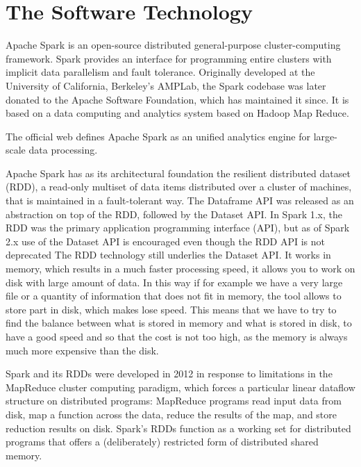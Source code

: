 \section{The Software Technology}
\label{sec:background}

Apache Spark is an open-source distributed general-purpose cluster-computing framework. Spark provides an interface for programming entire clusters with implicit data parallelism and fault tolerance. Originally developed at the University of California, Berkeley's AMPLab, the Spark codebase was later donated to the Apache Software Foundation, which has maintained it since. It is based on a data computing and analytics system based on Hadoop Map Reduce.

The official web defines Apache Spark as an unified analytics engine for large-scale data processing.

Apache Spark has as its architectural foundation the resilient distributed dataset (RDD), a read-only multiset of data items distributed over a cluster of machines, that is maintained in a fault-tolerant way.\cite{brown:zaharia2010spark} The Dataframe API was released as an abstraction on top of the RDD, followed by the Dataset API. In Spark 1.x, the RDD was the primary application programming interface (API), but as of Spark 2.x use of the Dataset API is encouraged \cite{brown:eadline2015hadoop} even though the RDD API is not deprecated The RDD technology still underlies the Dataset API.
It works in memory, which results in a much faster processing speed, it allows you to work on disk with large amount of data. In this way if for example we have a very large file or a quantity of information that does not fit in memory, the tool allows to store part in disk, which makes lose speed. This means that we have to try to find the balance between what is stored in memory and what is stored in disk, to have a good speed and so that the cost is not too high, as the memory is always much more expensive than the disk.

Spark and its RDDs were developed in 2012 in response to limitations in the MapReduce cluster computing paradigm, which forces a particular linear dataflow structure on distributed programs: MapReduce programs read input data from disk, map a function across the data, reduce the results of the map, and store reduction results on disk. Spark's RDDs function as a working set for distributed programs that offers a (deliberately) restricted form of distributed shared memory.\cite{zaharia2012resilient}

